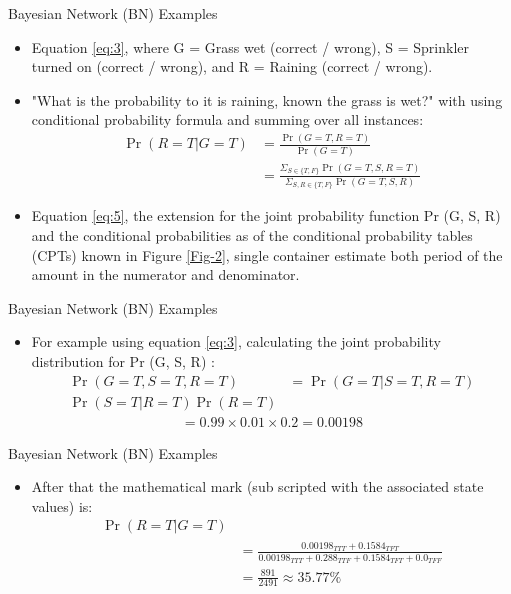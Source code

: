 \documentclass{beamer}
\providecommand{\pr}[1]{\ensuremath{\Pr\left(#1\right)}}
\begin{document}
\begin{frame}
 \begin{block}{Bayesian Network (BN) Examples}
    \begin{itemize}
    \item Equation \eqref{eq:3}, where G = Grass wet (correct / wrong), S = Sprinkler turned on (correct / wrong), and R = Raining (correct / wrong).
    \item "What is the probability to it is raining, known the grass is wet?" with using conditional probability formula and summing over all instances:
    \begin{align}
        \pr{R=T|G=T} &= \frac{\pr{G=T,R=T}}{\pr{G=T}} \\
        &= \frac{\Sigma_{S\in\{T,F\}}\pr{G=T,S,R=T}}{\Sigma_{S,R\in\{T,F\}}\pr{G=T,S,R}} \label{eq:5}
    \end{align}
    \item Equation \eqref{eq:5}, the extension for the joint probability function Pr (G, S, R) and the conditional probabilities as of the conditional probability tables (CPTs) known in Figure \ref{Fig-2}, single container estimate both period of the amount in the numerator and denominator.
    \end{itemize}
 \end{block}   
\end{frame}

\begin{frame}
 \begin{block}{Bayesian Network (BN) Examples}
    \begin{itemize}
    \item For example using equation \eqref{eq:3}, calculating the joint probability distribution for Pr (G, S, R) :
    \begin{multline}
        \pr{G=T,S=T,R=T} &= \pr{G=T|S=T,R=T} \\
        \pr{S=T|R=T}\pr{R=T}
    \end{multline}
    \begin{align}
        = 0.99 \times 0.01 \times 0.2 = 0.00198
    \end{align}
    \end{itemize}
 \end{block}   
\end{frame}

\begin{frame}
\begin{block}{Bayesian Network (BN) Examples}
\begin{itemize}
    \item After that the mathematical mark (sub scripted with the associated state values) is:
    \begin{multline}
        \pr{R=T|G=T}  \\
        &= \frac{0.00198_{TTT} + 0.1584_{TFT}}{0.00198_{TTT} + 0.288_{TTF} + 0.1584_{TFT} + 0.0_{TFF}} \\
        &= \frac{891}{2491} \approx 35.77\%
    \end{multline}
\end{itemize}
\end{block}
\end{frame}
\end{document}
